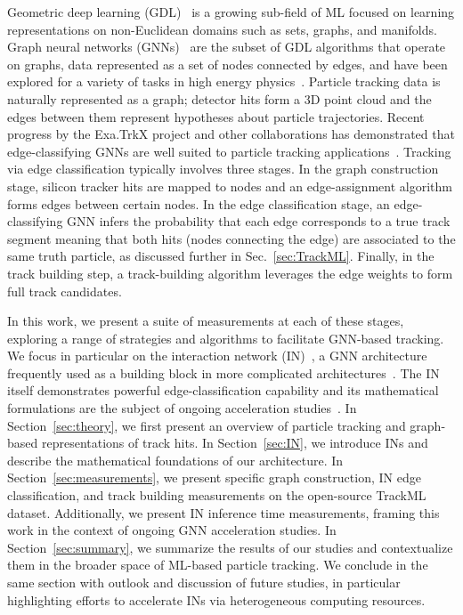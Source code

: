 \documentclass[twocolumn]{svjour3}
\begin{document}
Geometric deep learning (GDL)~\cite{gdl,zhang2020deep,zhou2019graph,wu2019comprehensive} is a growing sub-field of ML focused on learning representations on non-Euclidean domains such as sets, graphs, and manifolds. 
Graph neural networks (GNNs)~\cite{gnnmodel,pointnet,gilmer2017neural,IN,relational,DGCNN} are the subset of GDL algorithms that operate on graphs, data represented as a set of nodes connected by edges, and have been explored for a variety of tasks in high energy physics~\cite{duarte2020graph,Shlomi_2021}. 
Particle tracking data is naturally represented as a graph; detector hits form a 3D point cloud and the edges between them represent hypotheses about particle trajectories. 
Recent progress by the Exa.TrkX project and other collaborations has demonstrated that edge-classifying GNNs are well suited to particle tracking applications~\cite{heptrkx,exatrkx,IN_fpga,Ju:2021ayy}. 
Tracking via edge classification typically involves three stages. 
In the graph construction stage, silicon tracker hits are mapped to nodes and an edge-assignment algorithm forms edges between certain nodes. 
In the edge classification stage, an edge-classifying GNN infers the probability that each edge corresponds to a true track segment meaning that both hits (nodes connecting the edge) are associated to the same truth particle, as discussed further in Sec.~\ref{sec:TrackML}.
Finally, in the track building step, a track-building algorithm leverages the edge weights to form full track candidates.

In this work, we present a suite of measurements at each of these stages, exploring a range of strategies and algorithms to facilitate GNN-based tracking. 
We focus in particular on the interaction network (IN)~\cite{IN}, a GNN architecture frequently used as a building block in more complicated architectures~\cite{heptrkx,IN_fpga,Moreno:2019neq,Moreno:2019bmu}. 
The IN itself demonstrates powerful edge-classification capability and its mathematical formulations are the subject of ongoing acceleration studies~\cite{fpga}. 
In Section~\ref{sec:theory}, we first present an overview of particle tracking and graph-based representations of track hits.
In Section~\ref{sec:IN}, we introduce INs and describe the mathematical foundations of our architecture. 
In Section~\ref{sec:measurements}, we present specific graph construction, IN edge classification, and track building measurements on the open-source TrackML dataset. 
Additionally, we present IN inference time measurements, framing this work in the context of ongoing GNN acceleration studies.  
In Section~\ref{sec:summary}, we summarize the results of our studies and contextualize them in the broader space of ML-based particle tracking. 
We conclude in the same section with outlook and discussion of future studies, in particular highlighting efforts to accelerate INs via heterogeneous computing resources. 
\end{document}

